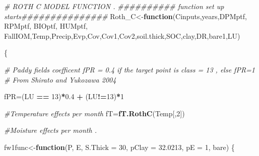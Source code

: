 \documentclass[
  10pt,
  b5paper,
]{book}
\newenvironment{Shaded}{\begin{snugshade}}{\end{snugshade}}
\newcommand{\CommentTok}[1]{\textcolor[rgb]{0.56,0.35,0.01}{\textit{#1}}}
\newcommand{\ControlFlowTok}[1]{\textcolor[rgb]{0.13,0.29,0.53}{\textbf{#1}}}
\newcommand{\DataTypeTok}[1]{\textcolor[rgb]{0.13,0.29,0.53}{#1}}
\newcommand{\DecValTok}[1]{\textcolor[rgb]{0.00,0.00,0.81}{#1}}
\newcommand{\FloatTok}[1]{\textcolor[rgb]{0.00,0.00,0.81}{#1}}
\newcommand{\KeywordTok}[1]{\textcolor[rgb]{0.13,0.29,0.53}{\textbf{#1}}}
\newcommand{\NormalTok}[1]{#1}
\newcommand{\OperatorTok}[1]{\textcolor[rgb]{0.81,0.36,0.00}{\textbf{#1}}}
\newcommand{\StringTok}[1]{\textcolor[rgb]{0.31,0.60,0.02}{#1}}
\begin{document}
\begin{Shaded}
\begin{Highlighting}[]
\CommentTok{# ROTH C MODEL FUNCTION .}
\CommentTok{########## function set up starts###############}
\NormalTok{Roth_C<-}\ControlFlowTok{function}\NormalTok{(Cinputs,years,DPMptf, RPMptf, BIOptf, HUMptf, FallIOM,Temp,Precip,Evp,Cov,Cov1,Cov2,soil.thick,SOC,clay,DR,bare1,LU)}

\NormalTok{\{}

\CommentTok{# Paddy fields coefficent fPR = 0.4 if the target point is class = 13 , else fPR=1}
\CommentTok{# From Shirato and Yukozawa 2004}

\NormalTok{fPR=(LU }\OperatorTok{==}\StringTok{ }\DecValTok{13}\NormalTok{)}\OperatorTok{*}\FloatTok{0.4} \OperatorTok{+}\StringTok{ }\NormalTok{(LU}\OperatorTok{!=}\DecValTok{13}\NormalTok{)}\OperatorTok{*}\DecValTok{1}

\CommentTok{#Temperature effects per month}
\NormalTok{fT=}\KeywordTok{fT.RothC}\NormalTok{(Temp[,}\DecValTok{2}\NormalTok{]) }

\CommentTok{#Moisture effects per month . }

\NormalTok{fw1func<-}\ControlFlowTok{function}\NormalTok{(P, E, }\DataTypeTok{S.Thick =} \DecValTok{30}\NormalTok{, }\DataTypeTok{pClay =} \FloatTok{32.0213}\NormalTok{, }\DataTypeTok{pE =} \DecValTok{1}\NormalTok{, bare) }
\NormalTok{\{}
   

\end{Highlighting}
\end{Shaded}
\end{document}
